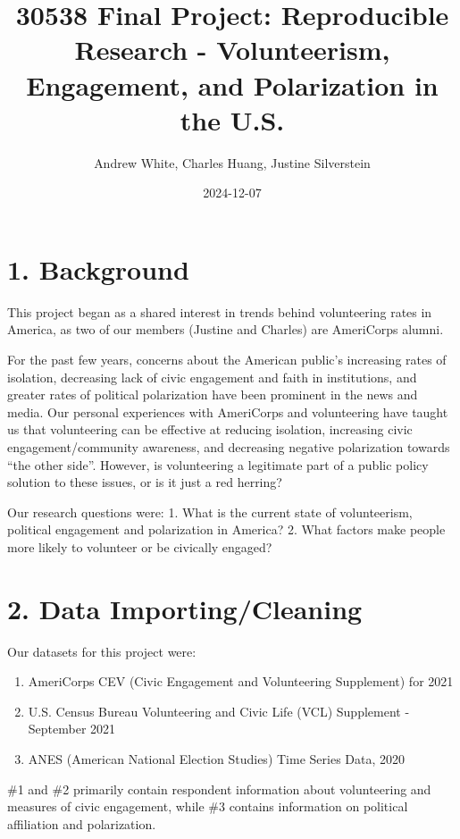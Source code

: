 \documentclass[
  letterpaper,
  DIV=11,
  numbers=noendperiod]{scrartcl}
\title{30538 Final Project: Reproducible Research - Volunteerism,
Engagement, and Polarization in the U.S.}
\author{Andrew White, Charles Huang, Justine Silverstein}
\date{2024-12-07}
\providecommand{\tightlist}{%
  \setlength{\itemsep}{0pt}\setlength{\parskip}{0pt}}\usepackage{longtable,booktabs,array}
\begin{document}
\maketitle


\section{1. Background}\label{background}

This project began as a shared interest in trends behind volunteering
rates in America, as two of our members (Justine and Charles) are
AmeriCorps alumni.

For the past few years, concerns about the American public's increasing
rates of isolation, decreasing lack of civic engagement and faith in
institutions, and greater rates of political polarization have been
prominent in the news and media. Our personal experiences with
AmeriCorps and volunteering have taught us that volunteering can be
effective at reducing isolation, increasing civic engagement/community
awareness, and decreasing negative polarization towards ``the other
side''. However, is volunteering a legitimate part of a public policy
solution to these issues, or is it just a red herring?

Our research questions were: 1. What is the current state of
volunteerism, political engagement and polarization in America? 2. What
factors make people more likely to volunteer or be civically engaged?

\section{2. Data Importing/Cleaning}\label{data-importingcleaning}

Our datasets for this project were:

\begin{enumerate}
\def\labelenumi{\arabic{enumi}.}
\tightlist
\item
  AmeriCorps CEV (Civic Engagement and Volunteering Supplement) for 2021
\item
  U.S. Census Bureau Volunteering and Civic Life (VCL) Supplement -
  September 2021
\item
  ANES (American National Election Studies) Time Series Data, 2020
\end{enumerate}

\#1 and \#2 primarily contain respondent information about volunteering
and measures of civic engagement, while \#3 contains information on
political affiliation and polarization.
\end{document}
